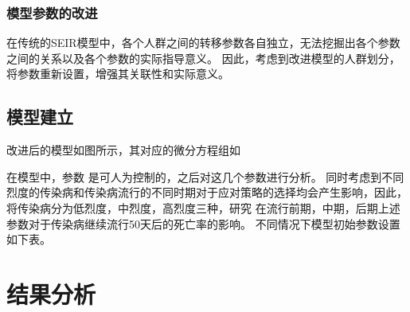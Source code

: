 \documentclass[withoutpreface,bwprint]{cumcmthesis}
\begin{document}
\subsubsection{模型参数的改进}
在传统的SEIR模型中，各个人群之间的转移参数各自独立，无法挖掘出各个参数之间的关系以及各个参数的实际指导意义。
因此，考虑到改进模型的人群划分，将参数重新设置，增强其关联性和实际意义。




\subsection{模型建立}

改进后的模型如图所示，其对应的微分方程组如


在模型中，参数   是可人为控制的，之后对这几个参数进行分析。
同时考虑到不同烈度的传染病和传染病流行的不同时期对于应对策略的选择均会产生影响，因此，将传染病分为低烈度，中烈度，高烈度三种，研究
在流行前期，中期，后期上述参数对于传染病继续流行50天后的死亡率的影响。
不同情况下模型初始参数设置如下表。

\section{结果分析}
\end{document}
